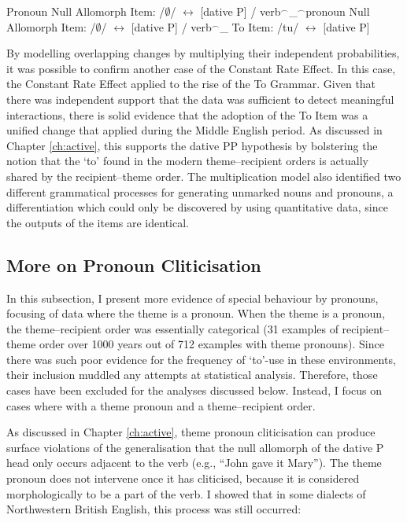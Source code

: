	\begin{exe}
		\ex 
		\begin{xlist}
			\ex Pronoun Null Allomorph Item: /$\emptyset$/ $\leftrightarrow$ [dative P] / verb$^{\smallfrown}$\_$^{\smallfrown}$pronoun
			\ex Null Allomorph Item: /$\emptyset$/ $\leftrightarrow$ [dative P] / verb$^{\smallfrown}$\_
			\ex To Item: /tu/ $\leftrightarrow$ [dative P]
		\end{xlist}
	\end{exe}


	By modelling overlapping changes by multiplying their independent probabilities, it was possible to confirm another case of the Constant Rate Effect. In this case, the Constant Rate Effect applied to the rise of the To Grammar. Given that there was independent support that the data was sufficient to detect meaningful interactions, there is solid evidence that the adoption of the To Item was a unified change that applied during the Middle English period. As discussed in Chapter \ref{ch:active}, this supports the dative PP hypothesis by bolstering the notion that the `to' found in the modern theme--recipient orders is actually shared by the recipient--theme order. The multiplication model also identified two different grammatical processes for generating unmarked nouns and pronouns, a differentiation which could only be discovered by using quantitative data, since the outputs of the items are identical.

	\subsection{More on Pronoun Cliticisation}
	In this subsection, I present more evidence of special behaviour by pronouns, focusing of data where the theme is a pronoun. When the theme is a pronoun, the theme--recipient order was essentially categorical (31 examples of recipient--theme order over 1000 years out of 712 examples with theme pronouns). Since there was such poor evidence for the frequency of `to'-use in these environments, their inclusion muddled any attempts at statistical analysis. Therefore, those cases have been excluded for the analyses discussed below. Instead, I focus on cases where with a theme pronoun and a theme--recipient order.

	As discussed in Chapter \ref{ch:active}, theme pronoun cliticisation can produce surface violations of the generalisation that the null allomorph of the dative P head only occurs adjacent to the verb (e.g., ``John gave it Mary''). The theme pronoun does not intervene once it has cliticised, because it is considered morphologically to be a part of the verb. I showed that in some dialects of Northwestern British English, this process was still occurred:

